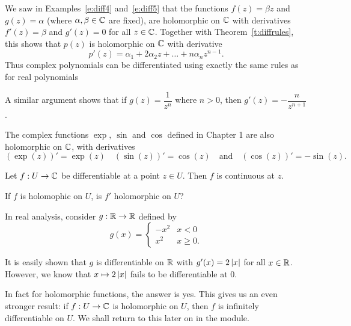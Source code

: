 \begin{solution}
We saw in Examples~\ref{e:diff4} and~\ref{e:diff5} that the functions $f(z) = \beta z$ and $g(z)= \alpha$ (where $\alpha, \beta \in \mathbb{C}$ are fixed), are holomorphic on $\mathbb{C}$ with derivatives $f'(z) = \beta$ and $g'(z)=0$ for all $z \in \mathbb{C}$.  Together with Theorem~\ref{t:diffrules}, this shows that $p(z)$ is holomorphic on $\mathbb{C}$ with derivative
\[
p'(z) = \alpha_1 + 2\alpha_2 z + \ldots + n \alpha_n z^{n-1}.
\]
Thus complex polynomials can be differentiated using exactly the same rules as for real polynomials
\end{solution}
\begin{note}
A similar argument shows that if $g(z) = \dfrac{1}{z^n}$ where $n >0$, then $g'(z) = -\dfrac{n}{z^{n+1}}$.
\end{note}
\begin{example}
The complex functions $\exp,\ \sin$ and $\cos$ defined in Chapter 1 are also holomorphic on $\mathbb{C}$, with derivatives
\[
\left( \exp (z) \right)'=\exp(z) \quad \left( \sin (z) \right)' = \cos (z) \quad\text{and}\quad \left( \cos(z) \right)' = - \sin(z).
\]
\end{example}



\begin{proposition}
\label{p:diffimpliescontinuous}
Let $f: U \to \mathbb{C}$ be differentiable at a point $z \in U$.  Then $f$ is continuous at $z$.
\end{proposition}


\begin{question} If $f$ is holomophic on $U$, is $f'$ holomorphic on $U$?
\end{question}
\begin{example}
In real analysis, consider $g:\mathbb{R} \to \mathbb{R}$ defined by
\[
g(x) = \begin{cases}
-x^2 & x<0 \\
x^2 & x\geq 0.
\end{cases}
\]
\begin{blankbox}
It is easily shown that $g$ is differentiable on $\mathbb{R}$ with $g'(x) = 2 \left| x \right|$ for all $x \in \mathbb{R}$.  However, we know that $x \mapsto 2 \left| x \right|$ fails to be differentiable at $0$.

In fact for holomorphic functions, the answer is yes.  This gives us an even stronger result: if $f:U \to \mathbb{C}$ is holomorphic on $U$, then $f$ is infinitely differentiable on $U$.  We shall return to this later on in the module.
\end{blankbox}
\end{example}

